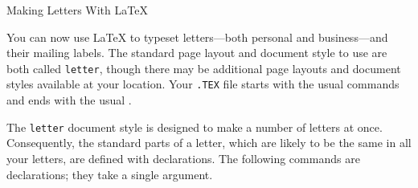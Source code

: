 

\newcommand\bs{\char '134 }  %
\newcommand\lb{\char '173 }  %
\newcommand\rb{\char '175 }  %




\begin{center}
\Large Making Letters With \LaTeX
\end{center}

You can now use \LaTeX{} to typeset letters---both personal and
bus\-i\-ness---and their mailing labels.  The standard page layout and
document style to use are both called \hbox{\tt letter}, though there
may be additional page layouts and document styles available at your
location.  Your {\tt .TEX} file starts with the usual commands and
ends with the usual \hbox{\verb""}.

The {\tt letter} document style is designed to make a number of
letters at once.  Consequently, the standard parts of a letter, which
are likely to be the same in all your letters, are defined with
declarations.  The following commands are declarations; they take a
single argument.

